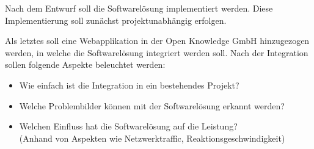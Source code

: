 Nach dem Entwurf soll die Softwarelösung implementiert werden. Diese Implementierung soll zunächst projektunabhängig erfolgen.

Als letztes soll eine Webapplikation in der Open Knowledge GmbH hinzugezogen werden, in welche die Softwarelösung integriert werden soll. Nach der Integration sollen folgende Aspekte beleuchtet werden:

\begin{itemize}
	\item Wie einfach ist die Integration in ein bestehendes Projekt?
	\item Welche Problembilder können mit der Softwarelösung erkannt werden?
	\item Welchen Einfluss hat die Softwarelösung auf die Leistung? \\(Anhand von Aspekten wie Netzwerktraffic, Reaktionsgeschwindigkeit)
\end{itemize}

